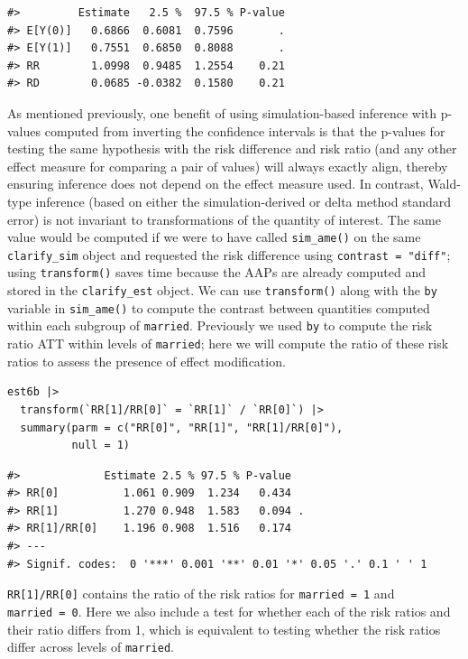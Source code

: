 \begin{verbatim}
#>         Estimate   2.5 %  97.5 % P-value
#> E[Y(0)]   0.6866  0.6081  0.7596       .
#> E[Y(1)]   0.7551  0.6850  0.8088       .
#> RR        1.0998  0.9485  1.2554    0.21
#> RD        0.0685 -0.0382  0.1580    0.21
\end{verbatim}
As mentioned previously, one benefit of using simulation-based inference with p-values computed from inverting the confidence intervals is that the p-values for testing the same hypothesis with the risk difference and risk ratio (and any other effect measure for comparing a pair of values) will always exactly align, thereby ensuring inference does not depend on the effect measure used. In contrast, Wald-type inference (based on either the simulation-derived or delta method standard error) is not invariant to transformations of the quantity of interest.
The same value would be computed if we were to have called \texttt{sim\_ame()} on the same \texttt{clarify\_sim} object and requested the risk difference using \texttt{contrast\ =\ "diff"}; using \texttt{transform()} saves time because the AAPs are already computed and stored in the \texttt{clarify\_est} object.
We can use \texttt{transform()} along with the \texttt{by} variable in \texttt{sim\_ame()} to compute the contrast between quantities computed within each subgroup of \texttt{married}. Previously we used \texttt{by} to compute the risk ratio ATT within levels of \texttt{married}; here we will compute the ratio of these risk ratios to assess the presence of effect modification.
\begin{verbatim}
est6b |>
  transform(`RR[1]/RR[0]` = `RR[1]` / `RR[0]`) |>
  summary(parm = c("RR[0]", "RR[1]", "RR[1]/RR[0]"),
          null = 1)
\end{verbatim}
\begin{verbatim}
#>             Estimate 2.5 % 97.5 % P-value  
#> RR[0]          1.061 0.909  1.234   0.434  
#> RR[1]          1.270 0.948  1.583   0.094 .
#> RR[1]/RR[0]    1.196 0.908  1.516   0.174  
#> ---
#> Signif. codes:  0 '***' 0.001 '**' 0.01 '*' 0.05 '.' 0.1 ' ' 1
\end{verbatim}
\texttt{RR{[}1{]}/RR{[}0{]}} contains the ratio of the risk ratios for \texttt{married\ =\ 1} and \texttt{married\ =\ 0}. Here we also include a test for whether each of the risk ratios and their ratio differs from 1, which is equivalent to testing whether the risk ratios differ across levels of \texttt{married}.
